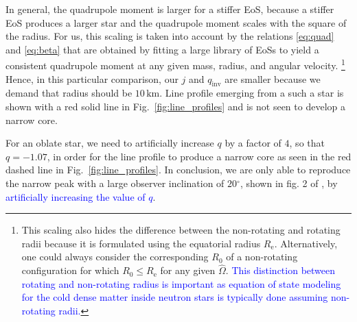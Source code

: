 \documentclass{aa}
\newcommand{\refe}[1]{\textcolor{blue}{{#1}}}
\newcommand{\refedel}[1]{}
\newcommand{\Ob}{\ensuremath{\hat{\Omega}}}
\newcommand{\Msun}{\ensuremath{M_{\odot}}}
\newcommand{\qinv}{\ensuremath{q_{\mathrm{inv}}}}
\renewcommand{\deg}{\ensuremath{^{\circ}}}
\begin{document}
In general, the quadrupole moment is larger for a stiffer EoS, because a stiffer EoS produces a larger star and the quadrupole moment scales with the square of the radius.
For us, this scaling is taken into account by the relations \eqref{eq:quad} and \eqref{eq:beta} that are obtained by fitting a large library of EoSs \citep[see][]{BBP13, aGM14} to yield a consistent quadrupole moment at any given mass, radius,\refedel{ (i.e., stiffness)} and angular velocity.%
\footnote{This scaling also hides the difference between the non-rotating and rotating radii because it is formulated using the equatorial radius $R_{\mathrm{e}}$.
Alternatively, one could always consider the corresponding $R_0$ of a non-rotating configuration for which $R_0 \le R_{\mathrm{e}}$ for any given $\Ob$.
\refe{This distinction between rotating and non-rotating radius is important as equation of state modeling for the cold dense matter inside neutron stars is typically done assuming non-rotating radii.}
}
Hence, in this particular comparison, our $j$ and $\qinv$ are smaller because we demand that radius should be $10\,\mathrm{km}$.
Line profile emerging from a such a star is shown with a red solid line in Fig.~\ref{fig:line_profiles} and is not seen to develop a narrow core. 
\refedel{This is because the quadrupole moment is not strong enough to dominate the countering effect of the region of increased redshift around the pole.}
For an oblate star, we need to artificially increase $q$ by a factor of $4$, so that $q = -1.07$, in order for the line profile to produce a narrow core as seen in the red dashed line in Fig.~\ref{fig:line_profiles}.
In conclusion, we are only able to reproduce the narrow peak with a large observer inclination of $20\deg$, shown in fig. 2 of \citet{BPO13}, by \refe{artificially increasing the value of $q$}. 
\end{document}
